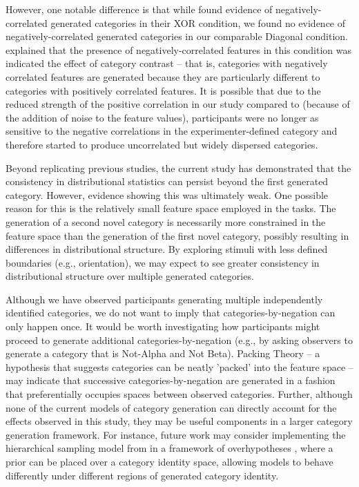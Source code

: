 \documentclass[10pt,letterpaper]{article}
\begin{document}
However, one notable difference is that while  found evidence of negatively-correlated generated categories in their XOR condition, we found no evidence of negatively-correlated generated categories in our comparable Diagonal condition.  explained that the presence of negatively-correlated features in this condition was indicated the effect of category contrast -- that is, categories with negatively correlated features are generated because they are particularly different to categories with positively correlated features. It is possible that due to the reduced strength of the positive correlation in our study compared to  (because of the addition of noise to the feature values), participants were no longer as sensitive to the negative correlations in the experimenter-defined category and therefore started to produce uncorrelated but widely dispersed categories.

Beyond replicating previous studies, the current study has demonstrated that the consistency in distributional statistics can persist beyond the first generated category. However, evidence showing this was ultimately weak. One possible reason for this is the relatively small feature space employed in the tasks. The generation of a second novel category is necessarily more constrained in the feature space than the generation of the first novel category, possibly resulting in differences in distributional structure. By exploring stimuli with less defined boundaries (e.g., orientation), we may expect to see greater consistency in distributional structure over multiple generated categories.

Although we have observed participants generating multiple independently identified categories, we do not want to imply that categories-by-negation can only happen once. It would be worth investigating how participants might proceed to generate additional categories-by-negation (e.g., by asking observers to generate a category that is Not-Alpha and Not Beta). Packing Theory \cite{hidaka2011packing} -- a hypothesis that suggests categories can be neatly 'packed' into the feature space -- may indicate that successive categories-by-negation are generated in a fashion that preferentially occupies spaces between observed categories. Further, although none of the current models of category generation can directly account for the effects observed in this study, they may be useful components in a larger category generation framework. For instance, future work may consider implementing the hierarchical sampling model from  in a framework of overhypotheses \cite{kemp07}, where a prior can be placed over a category identity space, allowing models to behave differently under different regions of generated category identity.
\end{document}
